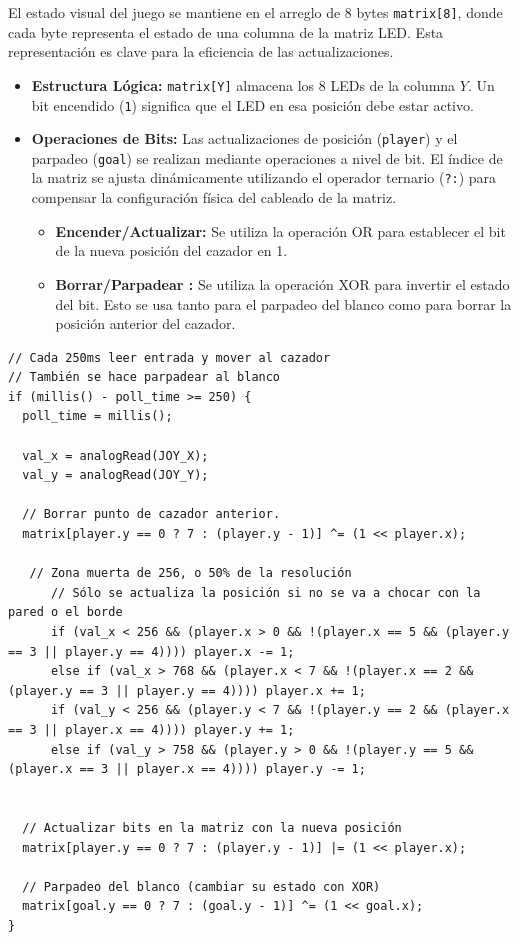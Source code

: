 El estado visual del juego se mantiene en el arreglo de 8 bytes \texttt{matrix[8]}, donde cada byte representa el estado de una columna de la matriz LED. Esta representación es clave para la eficiencia de las actualizaciones.

\begin{itemize}
    \item \textbf{Estructura Lógica:} \texttt{matrix[Y]} almacena los 8 LEDs de la columna $Y$. Un bit encendido (\texttt{1}) significa que el LED en esa posición debe estar activo.
    \item \textbf{Operaciones de Bits:} Las actualizaciones de posición (\texttt{player}) y el parpadeo (\texttt{goal}) se realizan mediante operaciones a nivel de bit. El índice de la matriz se ajusta dinámicamente utilizando el operador ternario (\texttt{?:}) para compensar la configuración física del cableado de la matriz.
    \begin{itemize}
        \item \textbf{Encender/Actualizar:} Se utiliza la operación OR  para establecer el bit de la nueva posición del cazador en 1.
        \item \textbf{Borrar/Parpadear :} Se utiliza la operación XOR para invertir el estado del bit. Esto se usa tanto para el parpadeo del blanco como para borrar la posición anterior del cazador.
    \end{itemize}
\end{itemize}



    \begin{verbatim}
// Cada 250ms leer entrada y mover al cazador
// También se hace parpadear al blanco
if (millis() - poll_time >= 250) {
  poll_time = millis();

  val_x = analogRead(JOY_X);
  val_y = analogRead(JOY_Y);

  // Borrar punto de cazador anterior.
  matrix[player.y == 0 ? 7 : (player.y - 1)] ^= (1 << player.x);

   // Zona muerta de 256, o 50% de la resolución
      // Sólo se actualiza la posición si no se va a chocar con la pared o el borde
      if (val_x < 256 && (player.x > 0 && !(player.x == 5 && (player.y == 3 || player.y == 4)))) player.x -= 1;
      else if (val_x > 768 && (player.x < 7 && !(player.x == 2 && (player.y == 3 || player.y == 4)))) player.x += 1;
      if (val_y < 256 && (player.y < 7 && !(player.y == 2 && (player.x == 3 || player.x == 4)))) player.y += 1;
      else if (val_y > 758 && (player.y > 0 && !(player.y == 5 && (player.x == 3 || player.x == 4)))) player.y -= 1;


  // Actualizar bits en la matriz con la nueva posición
  matrix[player.y == 0 ? 7 : (player.y - 1)] |= (1 << player.x);

  // Parpadeo del blanco (cambiar su estado con XOR)
  matrix[goal.y == 0 ? 7 : (goal.y - 1)] ^= (1 << goal.x);
}
\end{verbatim}



